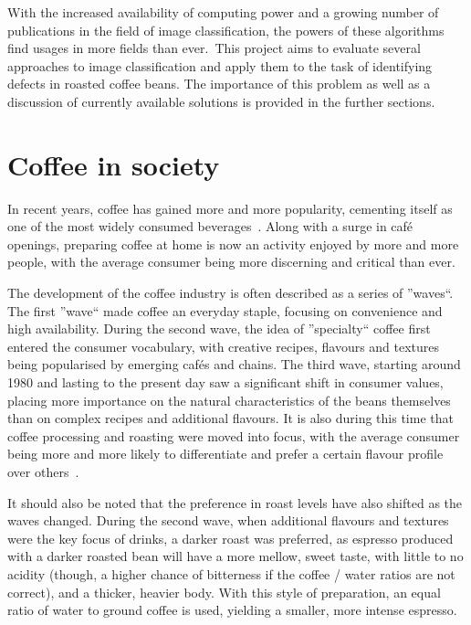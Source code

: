 With the increased availability of computing power and a growing number of publications in the field of
image classification, the powers of these algorithms find usages in more fields than ever.~This project aims to evaluate several approaches to image classification and apply them to the task of
identifying defects in roasted coffee beans.
The importance of this problem as well as a discussion of currently available solutions is provided in the further sections.
\section{Coffee in society}
\label{sec:coffee-in-society} In recent years, coffee has gained more and more popularity,
cementing itself as one of the most widely consumed beverages~\cite{coffeeConsumptionStats}.
Along with a surge
in café openings, preparing coffee at home is now an activity enjoyed by more
and more people, with the average consumer being more discerning and critical than
ever.

The development of the coffee industry is often described as a series of ''waves``.
The first ''wave`` made coffee an everyday staple, focusing on convenience and high
availability.
During the second wave, the idea of ''specialty`` coffee first entered
the consumer vocabulary, with creative recipes, flavours and textures being popularised
by emerging cafés and chains.
The third wave, starting around 1980 and lasting to
the present day saw a significant shift in consumer values, placing more importance on the natural characteristics
of the beans themselves than on complex recipes and additional flavours.
It is also during this time that coffee
processing and roasting were moved into focus, with the average consumer being more
and more likely to differentiate and prefer a certain flavour profile over others~\cite{coffeeWaves}.

It should also be noted that the preference in roast levels have also shifted as
the waves changed.
During the second wave, when additional flavours and textures
were the key focus of drinks, a darker roast was preferred, as espresso produced
with a darker roasted bean will have a more mellow, sweet taste, with little to no
acidity (though, a higher chance of bitterness if the coffee / water ratios are not
correct), and a thicker, heavier body.
With this style of preparation, an equal
ratio of water to ground coffee is used, yielding a smaller, more intense
espresso.

